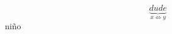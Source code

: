 \documentclass{article}
\newcommand{\n}{\~{n}}
\begin{document}

\[
\underbrace{dude}_{x \Leftrightarrow y }
\]
ni\n o
\end{document}

